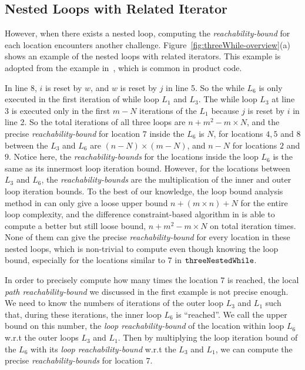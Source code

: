 \subsection{Nested Loops with Related Iterator}
\label{sec:overview-nestedwhile}
However, when there exists a nested loop, computing the \emph{reachability-bound} for each location encounters another challenge.
Figure~\ref{fig:threeWhile-overview}(a) shows an example of the nested loops with related 
iterators.
This example is adopted from the example in~\cite{GulwaniJK09}, which is common in product code.

In line 8, $i$ is reset by $w$, and $w$ is reset by $j$ in line 5. So the
while $L_6$ is only executed in the first iteration of while loop $L_1$ and $L_3$.
The while loop $L_3$ at line 3 is executed only in 
the first $m - N$ iterations of the 
$L_1$ because $j$ is reset by $i$ in line 2.
So the total iterations of all three loops are
$n + m^2 - m \times N$,
and the precise \emph{reachability-bound} for location $7$ inside the $L_6$ is $N$,
for locations $4, 5$ and $8$ between the $L_3$ and $L_6$ are $(n-N) \times (m - N)$,
and $n - N$ for locations $2$ and $9$.
Notice here, the \emph{reachability-bounds} for the locations inside the loop $L_6$ is 
the same as its innermost loop iteration bound.
However, for the locations between $L_3$ and $L_6$,
the \emph{reachability-bounds} are the multiplication of the inner and outer loop iteration bounds.
To the best of our knowledge, the loop bound analysis method in \cite{GulwaniJK09} can only give a loose upper bound $n + (m \times n) + N$ for the entire loop complexity, and 
the difference constraint-based algorithm in \cite{SinnZV17} is able to
compute a better but still loose bound, $n + m^2 - m \times N$ on total iteration times.
None of them can give the precise \emph{reachability-bound} for every location in these nested loops,
which is non-trivial to compute even though knowing the loop bound,
especially for the locations similar to $7$ in $\mathtt{threeNestedWhile}$.

In order to precisely compute how many times the location $7$ is reached, 
the local \emph{path reachability-bound} we discussed in the first example is not precise enough.
We need to know
the numbers of iterations of the outer loop $L_3$ and $L_1$ such that,
during these iterations, the inner loop $L_6$ is ``reached''. 
We call the upper bound on this number, the \emph{loop reachability-bound} of the location within loop $L_6$ w.r.t the outer loops $L_3$ and $L_1$.
Then by multiplying the loop iteration bound of the $L_6$ with its \emph{loop reachability-bound} w.r.t the $L_3$ and $L_1$, we can compute the precise
\emph{reachability-bounds} for location $7$.

